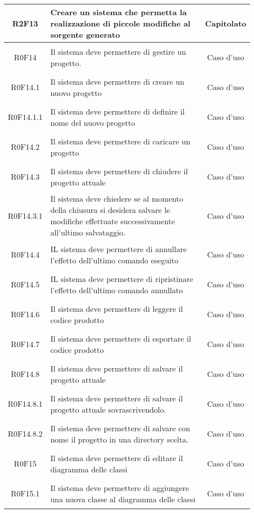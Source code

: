 \documentclass[../AnalisiDeiRequisiti.tex]{subfiles}
\begin{document}
\begin{longtable}{|c|>{\centering}p{7cm}|c|}
	\hypertarget{R2F13}{R2F13} & Creare un sistema che permetta la realizzazione di piccole modifiche al sorgente generato & Capitolato \\ \hline
	\hypertarget{R0F14}{R0F14} & Il sistema deve permettere di gestire un progetto. & Caso d'uso \\ \hline
	\hypertarget{R0F14.1}{R0F14.1} & Il sistema deve permettere di creare un nuovo progetto & Caso d'uso \\ \hline
	\hypertarget{R0F14.1.1}{R0F14.1.1} & Il sistema deve permettere di definire il nome del nuovo progetto & Caso d'uso \\ \hline
	\hypertarget{R0F14.2}{R0F14.2} & Il sistema deve permettere di caricare un progetto
	& Caso d'uso \\ \hline
	\hypertarget{R0F14.3}{R0F14.3} & Il sistema deve permettere di chiudere il progetto attuale & Caso d'uso \\ \hline
	\hypertarget{R0F14.3.1}{R0F14.3.1} & Il sistema deve chiedere se al momento della chiusura si desidera  salvare le modifiche effettuate successivamente all'ultimo salvataggio. & Caso d'uso \\ \hline
	\hypertarget{R0F14.4}{R0F14.4} & IL sistema deve permettere di annullare l'effetto dell'ultimo comando eseguito & Caso d'uso \\ \hline
	\hypertarget{R0F14.5}{R0F14.5} & IL sistema deve permettere di ripristinare l'effetto dell'ultimo comando annullato & Caso d'uso \\ \hline
	\hypertarget{R0F14.6}{R0F14.6} & Il sistema deve permettere di leggere il codice prodotto & Caso d'uso \\ \hline
	\hypertarget{R0F14.7}{R0F14.7} & Il sistema deve permettere di esportare il codice prodotto & Caso d'uso \\ \hline
	\hypertarget{R0F14.8}{R0F14.8} & Il sistema deve permettere di salvare il progetto attuale & Caso d'uso \\ \hline
	\hypertarget{R0F14.8.1}{R0F14.8.1} & Il sistema deve permettere di salvare il progetto attuale sovrascrivendolo. & Caso d'uso \\ \hline
	\hypertarget{R0F14.8.2}{R0F14.8.2} & Il sistema deve permettere di salvare con nome il progetto in una directory scelta. & Caso d'uso \\ \hline
	\hypertarget{R0F15}{R0F15} & Il sistema deve permettere di editare il diagramma delle classi & Caso d'uso \\ \hline
	\hypertarget{R0F15.1}{R0F15.1} & Il sistema deve permettere di aggiungere una nuova classe al diagramma delle classi & Caso d'uso \\ \hline

\end{longtable}
\end{document}

